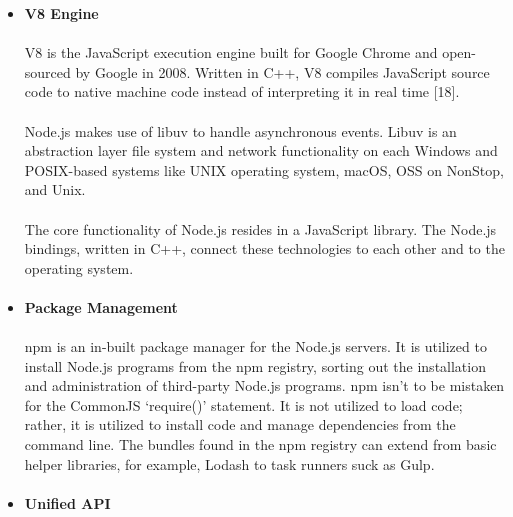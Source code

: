 \documentclass[a4paper, onecolumn, oneside, 11pt, wide, floatssmall]{mwrep}
\begin{document}
\begin{itemize}
    \paragraph{}
    \item \textbf{V8 Engine}
    \paragraph{}
    V8 is the JavaScript execution engine built for Google Chrome and open-sourced by Google in 2008. Written in C++, V8 compiles JavaScript source code to native machine code instead of interpreting it in real time [18].
    \paragraph{}
    Node.js makes use of libuv to handle asynchronous events. Libuv is an abstraction layer file system and network functionality on each Windows and POSIX-based systems like UNIX operating system, macOS, OSS on NonStop, and Unix.
    \paragraph{}
    The core functionality of Node.js resides in a JavaScript library. The Node.js bindings, written in C++, connect these technologies to each other and to the operating system.
    \paragraph{}
    \item \textbf{Package Management}
    \paragraph{}
    npm is an in-built package manager for the Node.js servers. It is utilized to install Node.js programs from the npm registry, sorting out the installation and administration of third-party Node.js programs. npm isn't to be mistaken for the CommonJS ‘require()’ statement. It is not utilized to load code; rather, it is utilized to install code and manage dependencies from the command line. The bundles found in the npm registry can extend from basic helper libraries, for example, Lodash to task runners suck as Gulp.
    \paragraph{}
    \item \textbf{Unified API}

\end{itemize}
\end{document}
